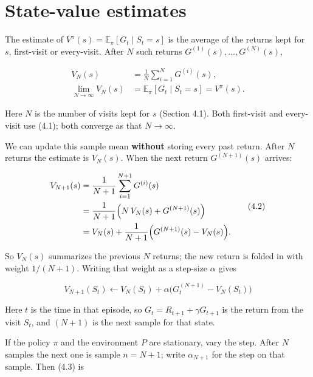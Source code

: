 \section{State-value estimates}

The estimate of $V^\pi(s)=\mathbb{E}_\pi[G_t\mid S_t=s]$ is the average of the returns kept for $s$, first-visit or every-visit. After $N$ such returns $G^{(1)}(s),\ldots,G^{(N)}(s)$,

\begin{equation}
\begin{aligned}
V_N(s)
&=
\frac{1}{N}\sum_{i=1}^{N} G^{(i)}(s),
\\
\lim_{N\to\infty} V_N(s)
&=
\mathbb{E}_\pi[G_t \mid S_t=s]
=
V^\pi(s).
\end{aligned}
\tag{4.1}
\end{equation}

Here $N$ is the number of visits kept for $s$ (Section 4.1). Both first-visit and every-visit use (4.1); both converge as that $N\to\infty$.

We can update this sample mean \textbf{without} storing every past return. After $N$ returns the estimate is $V_N(s)$. When the next return $G^{(N+1)}(s)$ arrives:

\begin{equation}
\begin{aligned}
V_{N+1}(s)
&=
\frac{1}{N+1}\sum_{i=1}^{N+1} G^{(i)}(s)
\\
&=
\frac{1}{N+1}\Bigl( N\,V_N(s) + G^{(N+1)}(s) \Bigr)
\\
&=
V_N(s) + \frac{1}{N+1}\Bigl( G^{(N+1)}(s) - V_N(s) \Bigr).
\end{aligned}
\tag{4.2}
\end{equation}

So $V_N(s)$ summarizes the previous $N$ returns; the new return is folded in with weight $1/(N{+}1)$. Writing that weight as a step-size $\alpha$ gives

\begin{equation}
V_{N+1}(S_t)
\leftarrow
V_N(S_t) + \alpha \bigl( G_t^{(N+1)} - V_N(S_t) \bigr)
\tag{4.3}
\end{equation}

Here $t$ is the time in that episode, so $G_t=R_{t+1}+\gamma G_{t+1}$ is the return from the visit $S_t$, and $(N{+}1)$ is the next sample for that state.

If the policy $\pi$ and the environment $P$ are stationary, vary the step. After $N$ samples the next one is sample $n=N{+}1$; write $\alpha_{N+1}$ for the step on that sample. Then (4.3) is

